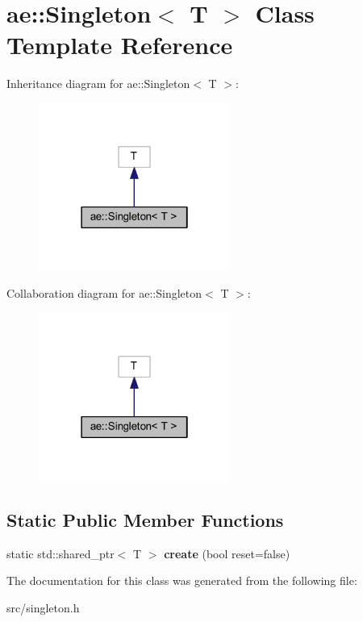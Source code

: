 \hypertarget{classae_1_1_singleton}{}\section{ae\+:\+:Singleton$<$ T $>$ Class Template Reference}
\label{classae_1_1_singleton}


Inheritance diagram for ae\+:\+:Singleton$<$ T $>$\+:
\nopagebreak
\begin{figure}[H]
\begin{center}
\leavevmode
\includegraphics[width=178pt]{classae_1_1_singleton__inherit__graph}
\end{center}
\end{figure}


Collaboration diagram for ae\+:\+:Singleton$<$ T $>$\+:
\nopagebreak
\begin{figure}[H]
\begin{center}
\leavevmode
\includegraphics[width=178pt]{classae_1_1_singleton__coll__graph}
\end{center}
\end{figure}
\subsection*{Static Public Member Functions}
\begin{DoxyCompactItemize}
\item 
\hypertarget{classae_1_1_singleton_abc6b9a3fe47623032128dd1963db9a7b}{}\label{classae_1_1_singleton_abc6b9a3fe47623032128dd1963db9a7b} 
static std\+::shared\+\_\+ptr$<$ T $>$ {\bfseries create} (bool reset=false)
\end{DoxyCompactItemize}


The documentation for this class was generated from the following file\+:\begin{DoxyCompactItemize}
\item 
src/singleton.\+h\end{DoxyCompactItemize}
